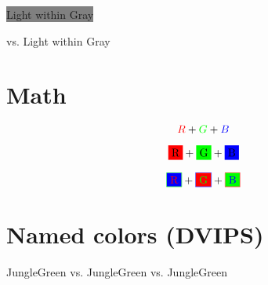 \documentclass{article}
\begin{document}
\colorbox{gray}{\textcolor{light}{Light within Gray}}

vs. \colorbox[gray]{0.5}{\textcolor{light}{Light within Gray}}



\section{Math}
\[ \textcolor{red}{R} + \textcolor{green}{G} + \textcolor{blue}{B} \]

\[ \colorbox{red}{R} + \colorbox{green}{G} + \colorbox{blue}{B} \]

\[ \fcolorbox{green}{blue}{\textcolor{red}{R}} + \fcolorbox{blue}{red}{\textcolor{green}{G}} + \fcolorbox{red}{green}{\textcolor{blue}{B}} \]

\section{Named colors (DVIPS)}
{\color[named]{JungleGreen} JungleGreen}
vs. \textcolor[named]{JungleGreen}{JungleGreen}
vs. \textcolor{myjunglegreen}{JungleGreen}
\end{document}
